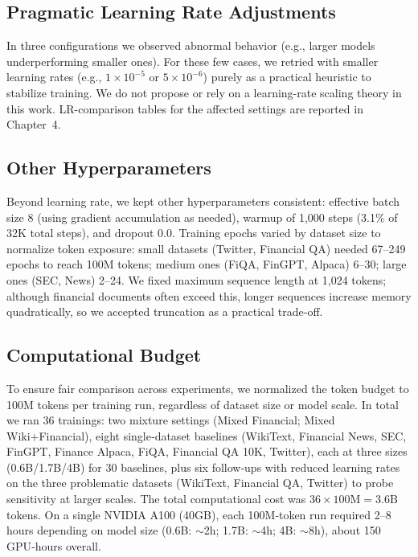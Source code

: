 \subsection{Pragmatic Learning Rate Adjustments}

In three configurations we observed abnormal behavior (e.g., larger models underperforming smaller ones). For these few cases, we retried with smaller learning rates (e.g., $1\times 10^{-5}$ or $5\times 10^{-6}$) purely as a practical heuristic to stabilize training. We do not propose or rely on a learning-rate scaling theory in this work. LR-comparison tables for the affected settings are reported in Chapter~4.

\subsection{Other Hyperparameters}

Beyond learning rate, we kept other hyperparameters consistent: effective batch size 8 (using gradient accumulation as needed), warmup of 1{,}000 steps (3.1\% of 32K total steps), and dropout 0.0. Training epochs varied by dataset size to normalize token exposure: small datasets (Twitter, Financial QA) needed 67–249 epochs to reach 100M tokens; medium ones (FiQA, FinGPT, Alpaca) 6–30; large ones (SEC, News) 2–24. We fixed maximum sequence length at 1{,}024 tokens; although financial documents often exceed this, longer sequences increase memory quadratically, so we accepted truncation as a practical trade‑off.

\subsection{Computational Budget}

To ensure fair comparison across experiments, we normalized the token budget to 100M tokens per training run, regardless of dataset size or model scale. In total we ran 36 trainings: two mixture settings (Mixed Financial; Mixed Wiki+Financial), eight single‑dataset baselines (WikiText, Financial News, SEC, FinGPT, Finance Alpaca, FiQA, Financial QA 10K, Twitter), each at three sizes (0.6B/1.7B/4B) for 30 baselines, plus six follow‑ups with reduced learning rates on the three problematic datasets (WikiText, Financial QA, Twitter) to probe sensitivity at larger scales. The total computational cost was $36\times100\text{M}=3.6\text{B}$ tokens. On a single NVIDIA A100 (40GB), each 100M‑token run required 2–8 hours depending on model size (0.6B: $\sim$2h; 1.7B: $\sim$4h; 4B: $\sim$8h), about 150 GPU‑hours overall.

